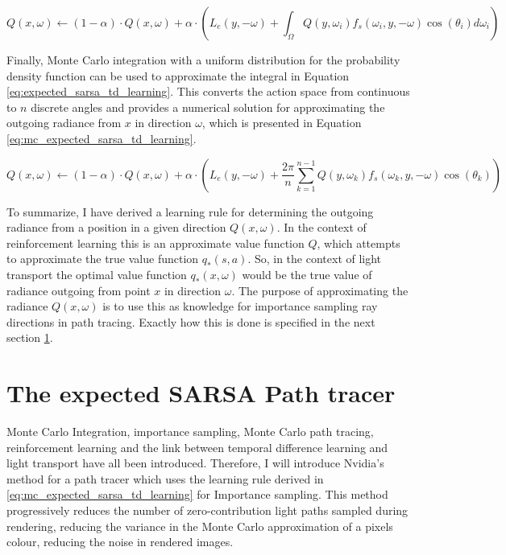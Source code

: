 \documentclass[ %
                    author={Callum Pearce},
                supervisor={Dr. Neill Campbell},
                    degree={MEng},
                     title={How effective are Temporal difference learning methods for reducing the number of zero contribution light paths while still accurately approximating Global Illumination in Path tracing?},
                  subtitle={},
                      type={research},
                      year={2019} ]{dissertation}
\begin{document}
\begin{equation}
Q(x, \omega) \leftarrow (1 - \alpha) \cdot Q(x, \omega) + \alpha \cdot \left( L_e(y, -\omega) + \int_\Omega Q(y, \omega_i) f_s(\omega_i, y, -\omega) \cos(\theta_i) d\omega_i \right)
\label{eq:expected_sarsa_td_learning}
\end{equation}

Finally, Monte Carlo integration with a uniform distribution for the probability density function can be used to approximate the integral in Equation \ref{eq:expected_sarsa_td_learning}. This converts the action space from continuous to $n$ discrete angles and provides a numerical solution for approximating the outgoing radiance from $x$ in direction $\omega$, which is presented in Equation \ref{eq:mc_expected_sarsa_td_learning}.

\begin{equation}
Q(x, \omega) \leftarrow (1 - \alpha) \cdot Q(x, \omega) + \alpha \cdot \left( L_e(y, -\omega) +\frac{2 \pi}{n} \sum_{k=1}^{n-1} Q(y, \omega_k) f_s(\omega_k, y, -\omega) \cos(\theta_k)  \right)
\label{eq:mc_expected_sarsa_td_learning}
\end{equation}

To summarize, I have derived a learning rule for determining the outgoing radiance from a position in a given direction $Q(x, \omega)$. In the context of reinforcement learning this is an approximate value function $Q$, which attempts to approximate the true value function $q_*(s,a)$. So, in the context of light transport the optimal value function $q_*(x, \omega)$ would be the true value of radiance outgoing from point $x$ in direction $\omega$. The purpose of approximating the radiance $Q(x, \omega)$ is to use this as knowledge for importance sampling ray directions in path tracing. Exactly how this is done is specified in the next section \ref{sec:expecte_sarsa_path_tracer}.

\section{The expected SARSA Path tracer}
\label{sec:expecte_sarsa_path_tracer}
Monte Carlo Integration, importance sampling, Monte Carlo path tracing, reinforcement learning and the link between temporal difference learning and light transport have all been introduced. Therefore, I will introduce Nvidia's method for a path tracer which uses the learning rule derived in \ref{eq:mc_expected_sarsa_td_learning} for Importance sampling. This method progressively reduces the number of zero-contribution light paths sampled during rendering, reducing the variance in the Monte Carlo approximation of a pixels colour, reducing the noise in rendered images. 
\end{document}
